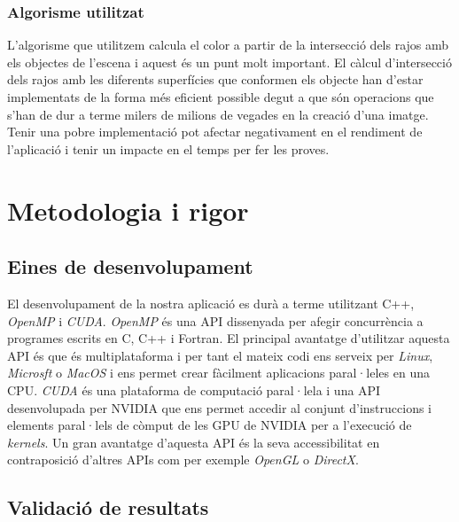 \documentclass[a4paper,titlepage]{article}
\begin{document}
\subsubsection{Algorisme utilitzat}

L'algorisme que utilitzem calcula el color a partir de la intersecció dels rajos amb els objectes de l'escena i aquest és un punt molt important. El càlcul d'intersecció dels rajos amb les diferents superfícies que conformen els objecte han d'estar implementats de la forma més eficient possible degut a que són operacions que s'han de dur a terme milers de milions de vegades en la creació d'una imatge. Tenir una pobre implementació pot afectar negativament en el rendiment de l'aplicació i tenir un impacte en el temps per fer les proves.

\section{Metodologia i rigor}

\subsection{Eines de desenvolupament}

El desenvolupament de la nostra aplicació es durà a terme utilitzant C++, \textit{OpenMP} i \textit{CUDA}. \textit{OpenMP} és una API dissenyada per afegir concurrència a programes escrits en  C, C++ i Fortran. El principal avantatge d'utilitzar aquesta API és que és multiplataforma i per tant el mateix codi ens serveix per \textit{Linux}, \textit{Microsft} o \textit{MacOS} i ens permet crear fàcilment aplicacions paral·leles en una CPU. \textit{CUDA} és una plataforma de computació paral·lela i una API desenvolupada per NVIDIA que ens permet accedir al conjunt d'instruccions i elements paral·lels de còmput de les GPU de NVIDIA per a l'execució de \textit{kernels}. Un gran avantatge d'aquesta API és la seva accessibilitat en contraposició d'altres APIs com per exemple \textit{OpenGL} o \textit{DirectX}. 

\subsection{Validació de resultats}



\newpage
\pagestyle{empty}



\end{document}
